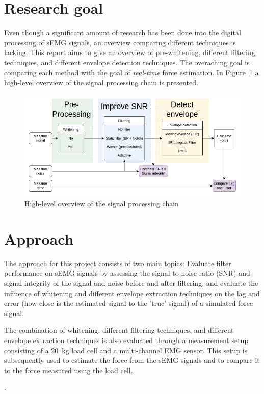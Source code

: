 \section{Research goal}
Even though a significant amount of research has been done into the digital processing of sEMG signals, an overview comparing different techniques is lacking. This report aims to give an overview of pre-whitening, different filtering techniques, and different envelope detection techniques. The overaching goal is comparing each method with the goal of \textit{real-time} force estimation. 
In Figure~\ref{fig:global_thesis_flowchart} a high-level overview of the signal processing chain is presented. 

\begin{figure}[h!t]
	\begin{center}
		\includegraphics[width=1.0\columnwidth]{images/global_thesis_flowchart.png}
	\end{center}
	\caption{High-level overview of the signal processing chain}
	\label{fig:global_thesis_flowchart}
\end{figure}


\section{Approach}
The approach for this project consists of two main topics: Evaluate filter performance on sEMG signals by assessing the signal to noise ratio (SNR) and signal integrity of the signal and noise before and after filtering, and evaluate the influence of whitening and different envelope extraction techniques on the lag and error (how close is the estimated signal to the 'true' signal) of a simulated force signal.

The combination of whitening, different filtering techniques, and different envelope extraction techniques is also evaluated through a measurement setup consisting of a \SI{20}{\kilo\gram} load cell and a multi-channel EMG sensor. This setup is subsequently used to estimate the force from the sEMG signals and to compare it to the force measured using the load cell.

.